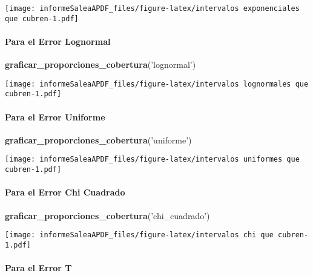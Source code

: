 \documentclass[]{article}
\newenvironment{Shaded}{\begin{snugshade}}{\end{snugshade}}
\newcommand{\KeywordTok}[1]{\textcolor[rgb]{0.13,0.29,0.53}{\textbf{#1}}}
\newcommand{\NormalTok}[1]{#1}
\newcommand{\StringTok}[1]{\textcolor[rgb]{0.31,0.60,0.02}{#1}}
\let\oldparagraph\paragraph
\renewcommand{\paragraph}[1]{\oldparagraph{#1}\mbox{}}
\begin{document}
\texttt{[image: informeSaleaAPDF\_files/figure-latex/intervalos exponenciales que cubren-1.pdf]}

\hypertarget{para-el-error-lognormal}{%
\paragraph{Para el Error Lognormal}\label{para-el-error-lognormal}}

\begin{Shaded}
\begin{Highlighting}[]
\KeywordTok{graficar_proporciones_cobertura}\NormalTok{(}\StringTok{'lognormal'}\NormalTok{)}
\end{Highlighting}
\end{Shaded}

\texttt{[image: informeSaleaAPDF\_files/figure-latex/intervalos lognormales que cubren-1.pdf]}

\hypertarget{para-el-error-uniforme}{%
\paragraph{Para el Error Uniforme}\label{para-el-error-uniforme}}

\begin{Shaded}
\begin{Highlighting}[]
\KeywordTok{graficar_proporciones_cobertura}\NormalTok{(}\StringTok{'uniforme'}\NormalTok{)}
\end{Highlighting}
\end{Shaded}

\texttt{[image: informeSaleaAPDF\_files/figure-latex/intervalos uniformes que cubren-1.pdf]}

\hypertarget{para-el-error-chi-cuadrado}{%
\paragraph{Para el Error Chi
Cuadrado}\label{para-el-error-chi-cuadrado}}

\begin{Shaded}
\begin{Highlighting}[]
\KeywordTok{graficar_proporciones_cobertura}\NormalTok{(}\StringTok{'chi_cuadrado'}\NormalTok{)}
\end{Highlighting}
\end{Shaded}

\texttt{[image: informeSaleaAPDF\_files/figure-latex/intervalos chi que cubren-1.pdf]}

\hypertarget{para-el-error-t}{%
\paragraph{Para el Error T}\label{para-el-error-t}}
\end{document}
